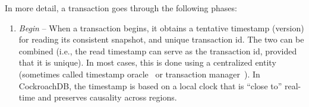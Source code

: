 
In more detail, a transaction goes through the following phases:
\begin{enumerate}
  \item \emph{Begin} -- 
  When a transaction begins, it obtains a tentative timestamp (version) for reading its consistent snapshot, and unique transaction id.
  The two can be combined (i.e., the read timestamp can serve as the  transaction id, provided that it is unique).
  In most cases, this is done using a centralized entity (sometimes called timestamp oracle~\cite{Percolator2010,OmidICDE2014}
   or transaction manager~\cite{omid-blog}). 
  In CockroachDB, the timestamp is based on a local clock that is ``close to'' real-time and preserves causality 
  across regions. 


\end{enumerate}
